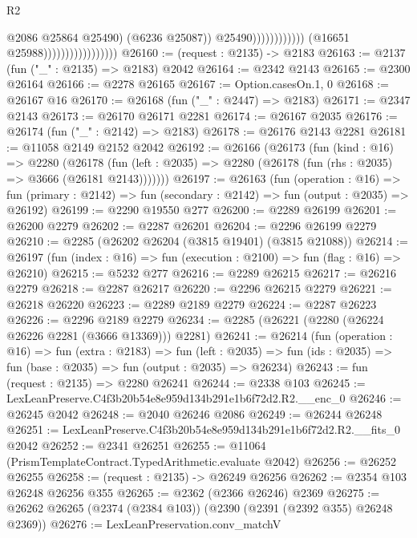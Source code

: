 \begin{lexlean}{R2}
\begin{coremodule}
                                                                @2086
                                                                @25864
                                                                @25490)
                                                              (@6236 @25087))
                                                            @25490))))))))))))
                                    (@16651 @25988)))))))))))))))))
@26160 := (request : @2135) -> @2183
@26163 := @2137 (fun ("_" : @2135) => @2183) @2042
@26164 := @2342 @2143
@26165 := @2300 @26164
@26166 := @2278 @26165
@26167 := Option.casesOn.{1, 0}
@26168 := @26167 @16
@26170 := @26168 (fun ("_" : @2447) => @2183)
@26171 := @2347 @2143
@26173 := @26170 @26171 @2281
@26174 := @26167 @2035
@26176 := @26174 (fun ("_" : @2142) => @2183)
@26178 := @26176 @2143 @2281
@26181 := @11058 @2149 @2152 @2042
@26192 := @26166
    (@26173
      (fun (kind : @16) =>
      @2280
        (@26178
          (fun (left : @2035) => @2280 (@26178 (fun (rhs : @2035) => @3666 (@26181 @2143)))))))
@26197 := @26163
    (fun (operation : @16) =>
    fun (primary : @2142) => fun (secondary : @2142) => fun (output : @2035) => @26192)
@26199 := @2290 @19550 @277
@26200 := @2289 @26199
@26201 := @26200 @2279
@26202 := @2287 @26201
@26204 := @2296 @26199 @2279
@26210 := @2285 (@26202 @26204 (@3815 @19401) (@3815 @21088))
@26214 := @26197 (fun (index : @16) => fun (execution : @2100) => fun (flag : @16) => @26210)
@26215 := @5232 @277
@26216 := @2289 @26215
@26217 := @26216 @2279
@26218 := @2287 @26217
@26220 := @2296 @26215 @2279
@26221 := @26218 @26220
@26223 := @2289 @2189 @2279
@26224 := @2287 @26223
@26226 := @2296 @2189 @2279
@26234 := @2285 (@26221 (@2280 (@26224 @26226 @2281 (@3666 @13369))) @2281)
@26241 := @26214
    (fun (operation : @16) =>
    fun (extra : @2183) =>
    fun (left : @2035) => fun (ids : @2035) => fun (base : @2035) => fun (output : @2035) => @26234)
@26243 := fun (request : @2135) => @2280 @26241
@26244 := @2338 @103
@26245 := LexLeanPreserve.C4f3b20b54e8e959d134b291e1b6f72d2.R2.__enc_0
@26246 := @26245 @2042
@26248 := @2040 @26246 @2086
@26249 := @26244 @26248
@26251 := LexLeanPreserve.C4f3b20b54e8e959d134b291e1b6f72d2.R2.__fits_0 @2042
@26252 := @2341 @26251
@26255 := @11064 (PrismTemplateContract.TypedArithmetic.evaluate @2042)
@26256 := @26252 @26255
@26258 := (request : @2135) -> @26249 @26256
@26262 := @2354 @103 @26248 @26256 @355
@26265 := @2362 (@2366 @26246) @2369
@26275 := @26262 @26265 (@2374 (@2384 @103)) (@2390 (@2391 (@2392 @355) @26248 @2369))
@26276 := LexLeanPreservation.conv_matchV

\end{coremodule}
\end{lexlean}
